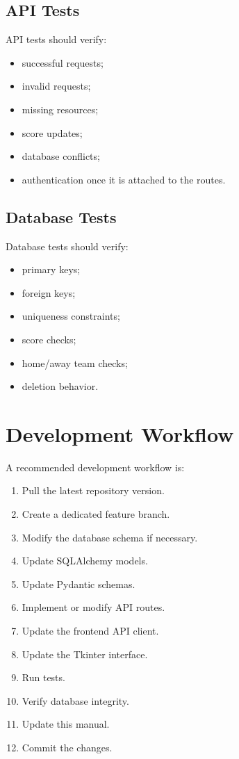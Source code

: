 \documentclass[12pt,a4paper]{article}
\begin{document}
\subsection{API Tests}

API tests should verify:

\begin{itemize}
    \item successful requests;
    \item invalid requests;
    \item missing resources;
    \item score updates;
    \item database conflicts;
    \item authentication once it is attached to the routes.
\end{itemize}

\subsection{Database Tests}

Database tests should verify:

\begin{itemize}
    \item primary keys;
    \item foreign keys;
    \item uniqueness constraints;
    \item score checks;
    \item home/away team checks;
    \item deletion behavior.
\end{itemize}


\section{Development Workflow}

A recommended development workflow is:

\begin{enumerate}
    \item Pull the latest repository version.
    \item Create a dedicated feature branch.
    \item Modify the database schema if necessary.
    \item Update SQLAlchemy models.
    \item Update Pydantic schemas.
    \item Implement or modify API routes.
    \item Update the frontend API client.
    \item Update the Tkinter interface.
    \item Run tests.
    \item Verify database integrity.
    \item Update this manual.
    \item Commit the changes.
\end{enumerate}
\end{document}
